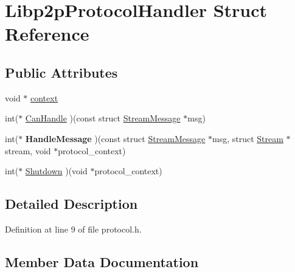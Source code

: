 \hypertarget{struct_libp2p_protocol_handler}{}\section{Libp2p\+Protocol\+Handler Struct Reference}
\label{struct_libp2p_protocol_handler}
\subsection*{Public Attributes}
\begin{DoxyCompactItemize}
\item 
void $\ast$ \mbox{\hyperlink{struct_libp2p_protocol_handler_a95a6ff6efff9baf5c09bbd00f895f9e2}{context}}
\item 
int($\ast$ \mbox{\hyperlink{struct_libp2p_protocol_handler_abb819af38fb6c4ae6ab11ab8e58c6467}{Can\+Handle}} )(const struct \mbox{\hyperlink{struct_stream_message}{Stream\+Message}} $\ast$msg)
\item 
\mbox{\label{struct_libp2p_protocol_handler_a2303e36bf158ec8c6cd0d787f1944bb0}} 
int($\ast$ {\bfseries Handle\+Message} )(const struct \mbox{\hyperlink{struct_stream_message}{Stream\+Message}} $\ast$msg, struct \mbox{\hyperlink{struct_stream}{Stream}} $\ast$stream, void $\ast$protocol\+\_\+context)
\item 
int($\ast$ \mbox{\hyperlink{struct_libp2p_protocol_handler_a99321f59de18af32c0332bd8b37afd83}{Shutdown}} )(void $\ast$protocol\+\_\+context)
\end{DoxyCompactItemize}


\subsection{Detailed Description}


Definition at line 9 of file protocol.\+h.



\subsection{Member Data Documentation}
\mbox{\label{struct_libp2p_protocol_handler_abb819af38fb6c4ae6ab11ab8e58c6467}} 
